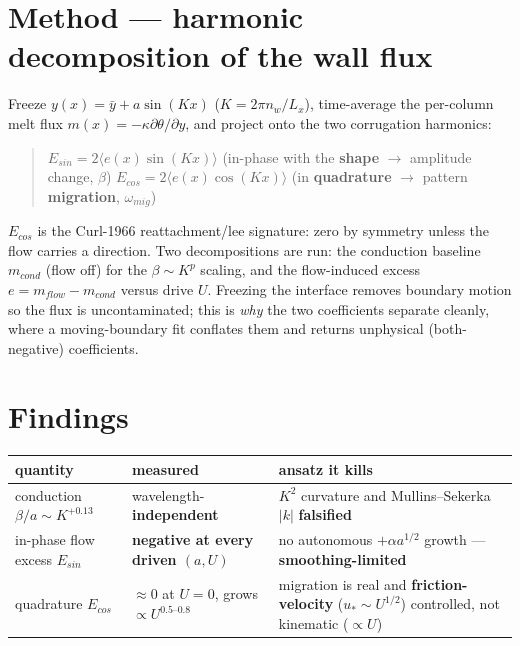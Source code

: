 \documentclass[tc, manuscript]{copernicus}
\begin{document}
\section{Method — harmonic decomposition of the wall flux}

Freeze $y(x)=\bar{y}+a \sin(Kx)$ ($K=2\pi n_{w}/L_{x}$), time-average the per-column melt flux $m(x)=-\kappa  \partial \theta /\partial y$, and project onto the two corrugation harmonics:

\begin{quote}
$E_{sin} = 2\langle e(x) \sin(Kx)\rangle $ (in-phase with the \textbf{shape} \ensuremath{\to} amplitude change, $\beta $) $E_{cos} = 2\langle e(x) \cos(Kx)\rangle $ (in \textbf{quadrature} \ensuremath{\to} pattern \textbf{migration}, $\omega _{mig}$)
\end{quote}

$E_{cos}$ is the Curl-1966 reattachment/lee signature: zero by symmetry unless the flow carries a direction. Two decompositions are run: the conduction baseline $m_{cond}$ (flow off) for the $\beta  \sim  K^{p}$ scaling, and the flow-induced excess $e = m_{flow} - m_{cond}$ versus drive $U$. Freezing the interface removes boundary motion so the flux is uncontaminated; this is \emph{why} the two coefficients separate cleanly, where a moving-boundary fit conflates them and returns unphysical (both-negative) coefficients.

\section{Findings}

\begin{center}\small
\begin{tabularx}{\linewidth}{>{\raggedright\arraybackslash}X>{\raggedright\arraybackslash}X>{\raggedright\arraybackslash}X}
\hline
quantity & measured & ansatz it kills \\
\hline
conduction $\beta /a \sim  K^{+0.13}$ & wavelength-\textbf{independent} & $K^{2}$ curvature and Mullins–Sekerka $|k|$ \textbf{falsified} \\
in-phase flow excess $E_{sin}$ & \textbf{negative at every driven $(a,U)$} & no autonomous $+\alpha  a^{1/2}$ growth — \textbf{smoothing-limited} \\
quadrature $E_{cos}$ & $\approx 0$ at $U=0$, grows $\propto  U^{0.5\mbox{--}0.8}$ & migration is real and \textbf{friction-velocity} ($u_*\sim U^{1/2}$) controlled, not kinematic ($\propto U$) \\
\hline
\end{tabularx}
\end{center}
\end{document}
